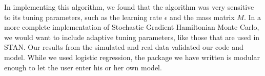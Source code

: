 In implementing this algorithm, we found that the algorithm was very sensitive to its tuning parameters, such as the learning rate $\epsilon$ and the mass matrix $M$. In a more complete implementation of Stochastic Gradient Hamiltonian Monte Carlo, we would want to include adaptive tuning parameters, like those that are used in STAN. Our results from the simulated and real data validated our code and model. While we used logistic regression, the package we have written is modular enough to let the user enter his or her own model.